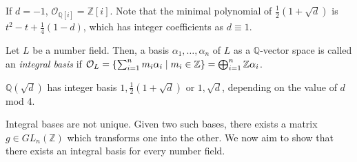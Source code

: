 \begin{example}
    If \( d = -1 \), \( \mathcal O_{\mathbb Q[i]} = \mathbb Z[i] \).
    Note that the minimal polynomial of \( \frac{1}{2}(1+\sqrt d) \) is \( t^2 - t + \frac{1}{4}(1-d) \), which has integer coefficients as \( d \equiv 1 \).
\end{example}
\begin{definition}
    Let \( L \) be a number field.
    Then, a basis \( \alpha_1, \dots, \alpha_n \) of \( L \) as a \( \mathbb Q \)-vector space is called an \emph{integral basis} if \( \mathcal O_L = \qty{\sum_{i=1}^n m_i \alpha_i \mid m_i \in \mathbb Z} = \bigoplus_{i=1}^n \mathbb Z \alpha_i \).
\end{definition}
\begin{example}
    \( \mathbb Q(\sqrt d) \) has integer basis \( 1, \frac{1}{2}(1+\sqrt d) \) or \( 1, \sqrt d \), depending on the value of \( d \) mod 4.
\end{example}
Integral bases are not unique.
Given two such bases, there exists a matrix \( g \in GL_n(\mathbb Z) \) which transforms one into the other.
We now aim to show that there exists an integral basis for every number field.

